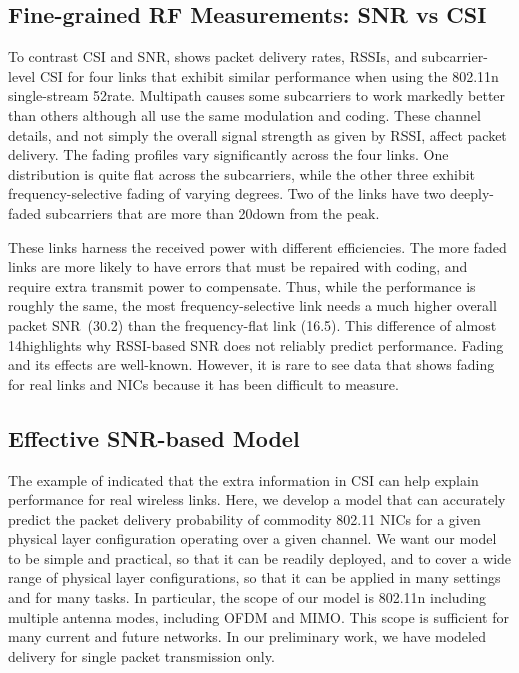 \subsection{Fine-grained RF Measurements: SNR vs CSI}
To contrast CSI and SNR,  shows packet delivery rates, RSSIs, and subcarrier-level CSI for four links that exhibit similar performance when using the 802.11n single-stream 52\Mbps rate. Multipath causes some subcarriers to work markedly better than others although all use the same modulation and coding. These channel details, and not simply the overall signal strength as given by RSSI, affect packet delivery. The fading profiles vary significantly across the four links. One distribution is quite flat across the subcarriers, while the other three exhibit frequency-selective fading of varying degrees. Two of the links have two deeply-faded subcarriers that are more than 20\dB down from the peak.

These links harness the received power with different efficiencies.
The more faded links are more likely to have errors that must be repaired with coding, and require extra transmit power to compensate. Thus, while the performance is roughly the same, the most frequency-selective link needs a much higher overall packet SNR~(30.2\dB) than the frequency-flat link (16.5\dB). This difference of almost 14\dB highlights why RSSI-based SNR does not reliably predict performance. Fading and its effects are well-known. However, it is rare to see data that shows fading for real links and NICs because it has been difficult to measure.

\subsection{Effective SNR-based Model}
The example of  indicated that the extra information in CSI can help explain performance for real wireless links. Here, we develop a model that can accurately predict the packet delivery probability of commodity 802.11 NICs for a given physical layer configuration operating over a given channel. We want our model to be simple and practical, so that it can be readily deployed, and to cover a wide range of physical layer configurations, so that it can be applied in many settings and for many tasks. In particular, the scope of our model is 802.11n including multiple antenna modes, including OFDM and MIMO\@. This scope is sufficient for many current and future networks. In our preliminary work, we have modeled delivery for single packet transmission only.

